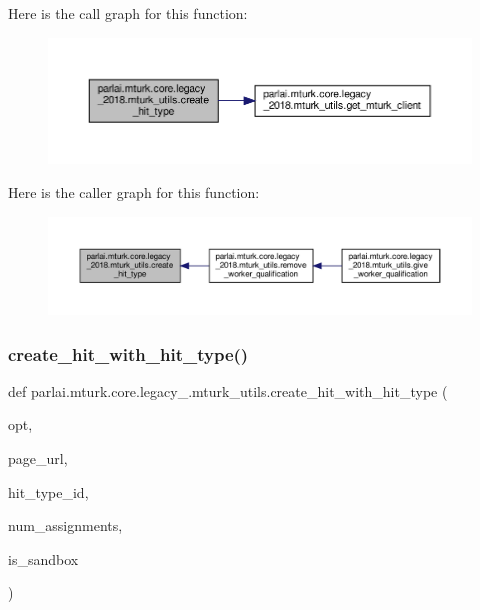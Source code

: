 Here is the call graph for this function\+:
\nopagebreak
\begin{figure}[H]
\begin{center}
\leavevmode
\includegraphics[width=350pt]{namespaceparlai_1_1mturk_1_1core_1_1legacy__2018_1_1mturk__utils_a96dff775cc211227da667088e259c279_cgraph}
\end{center}
\end{figure}
Here is the caller graph for this function\+:
\nopagebreak
\begin{figure}[H]
\begin{center}
\leavevmode
\includegraphics[width=350pt]{namespaceparlai_1_1mturk_1_1core_1_1legacy__2018_1_1mturk__utils_a96dff775cc211227da667088e259c279_icgraph}
\end{center}
\end{figure}
\mbox{\label{namespaceparlai_1_1mturk_1_1core_1_1legacy__2018_1_1mturk__utils_a98f3bb533401557bf8156d1b5b268df3}} 
\subsubsection{\texorpdfstring{create\+\_\+hit\+\_\+with\+\_\+hit\+\_\+type()}{create\_hit\_with\_hit\_type()}}
{\footnotesize\ttfamily def parlai.\+mturk.\+core.\+legacy\+\_.\+mturk\+\_\+utils.\+create\+\_\+hit\+\_\+with\+\_\+hit\+\_\+type (\begin{DoxyParamCaption}\item[{}]{opt,  }\item[{}]{page\+\_\+url,  }\item[{}]{hit\+\_\+type\+\_\+id,  }\item[{}]{num\+\_\+assignments,  }\item[{}]{is\+\_\+sandbox }\end{DoxyParamCaption})}


